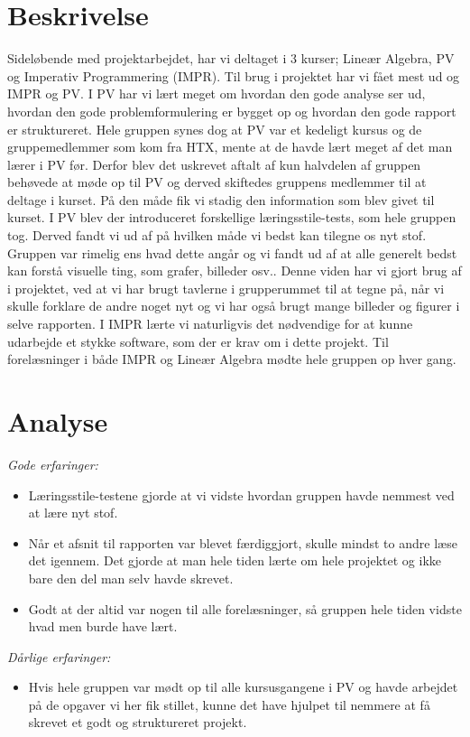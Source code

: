 \section{Beskrivelse}
Sideløbende med projektarbejdet, har vi deltaget i 3 kurser; Lineær Algebra, PV og Imperativ Programmering (IMPR). Til brug i projektet har vi fået mest ud og IMPR og PV. I PV har vi lært meget om hvordan den gode analyse ser ud, hvordan den gode problemformulering er bygget op og hvordan den gode rapport er struktureret. Hele gruppen synes dog at PV var et kedeligt kursus og de gruppemedlemmer som kom fra HTX, mente at de havde lært meget af det man lærer i PV før. Derfor blev det uskrevet aftalt af kun halvdelen af gruppen behøvede at møde op til PV og derved skiftedes gruppens medlemmer til at deltage i kurset. På den måde fik vi stadig den information som blev givet til kurset.
I PV blev der introduceret forskellige læringsstile-tests, som hele gruppen tog. Derved fandt vi ud af på hvilken måde vi bedst kan tilegne os nyt stof. Gruppen var rimelig ens hvad dette angår og vi fandt ud af at alle generelt bedst kan forstå visuelle ting, som grafer, billeder osv.. Denne viden har vi gjort brug af i projektet, ved at vi har brugt tavlerne i grupperummet til at tegne på, når vi skulle forklare de andre noget nyt og vi har også brugt mange billeder og figurer i selve rapporten. 
I IMPR lærte vi naturligvis det nødvendige for at kunne udarbejde et stykke software, som der er krav om i dette projekt. Til forelæsninger i både IMPR og Lineær Algebra mødte hele gruppen op hver gang. 

\section{Analyse}

\emph{Gode erfaringer:}
\begin{itemize}
\item	Læringsstile-testene gjorde at vi vidste hvordan gruppen havde nemmest ved at lære nyt stof. 

\item	 Når et afsnit til rapporten var blevet færdiggjort, skulle mindst to andre læse det igennem. Det gjorde at man hele tiden lærte om hele projektet og ikke bare den del man selv havde skrevet. 

\item	Godt at der altid var nogen til alle forelæsninger, så gruppen hele tiden vidste hvad men burde have lært.
\end{itemize}\emph{Dårlige erfaringer:}
\begin{itemize}
\item	Hvis hele gruppen var mødt op til alle kursusgangene i PV og havde arbejdet på de opgaver vi her fik stillet, kunne det have hjulpet til nemmere at få skrevet et godt og struktureret projekt. 

\end{itemize}	 

